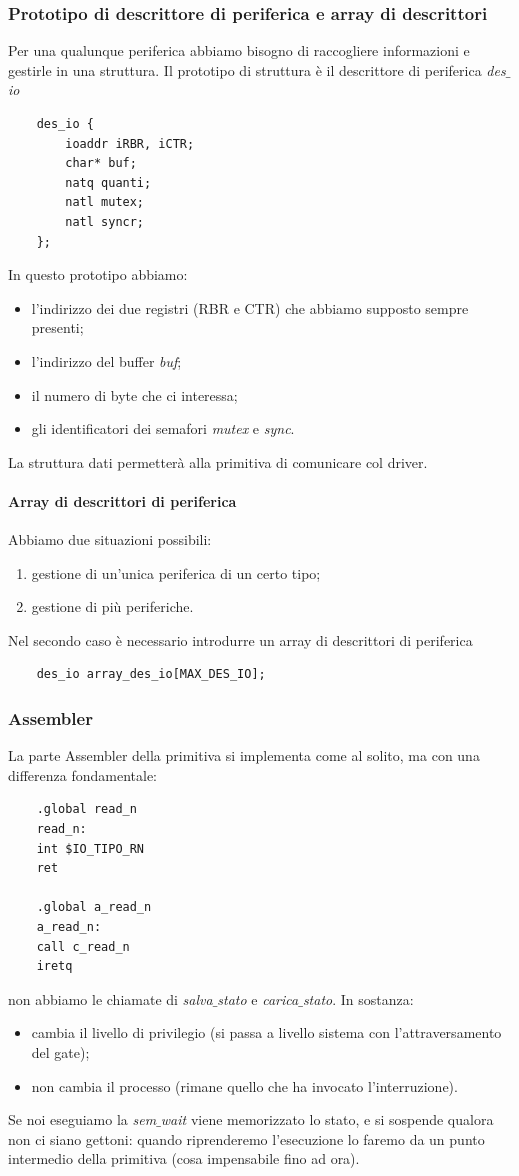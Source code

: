\subsubsection{Prototipo di descrittore di periferica e array di descrittori} Per una qualunque periferica abbiamo bisogno di raccogliere informazioni e gestirle in una struttura. Il prototipo di struttura è il descrittore di periferica \emph{des$\_$io}
\begin{verbatim}
	des_io {
		ioaddr iRBR, iCTR;
		char* buf;
		natq quanti;
		natl mutex;
		natl syncr;
	};
\end{verbatim}
In questo prototipo abbiamo:
\begin{itemize}
	\item l'indirizzo dei due registri (RBR e CTR) che abbiamo supposto sempre presenti;
	\item l'indirizzo del buffer \emph{buf};
	\item il numero di byte che ci interessa;
	\item gli identificatori dei semafori \emph{mutex} e \emph{sync}.
\end{itemize}
La struttura dati permetterà alla primitiva di comunicare col driver.
\paragraph{Array di descrittori di periferica}
Abbiamo due situazioni possibili:
\begin{enumerate}
	\item gestione di un'unica periferica di un certo tipo;
	\item gestione di più periferiche.
\end{enumerate} 
Nel secondo caso è necessario introdurre un array di descrittori di periferica
\begin{verbatim}
	des_io array_des_io[MAX_DES_IO];
\end{verbatim}


\subsubsection{Assembler} La parte Assembler della primitiva si implementa come al solito, ma con una differenza fondamentale:
\begin{verbatim}
	.global read_n
	read_n:
	int $IO_TIPO_RN
	ret
	
	.global a_read_n
	a_read_n:
	call c_read_n
	iretq
\end{verbatim}
non abbiamo le chiamate di \emph{salva$\_$stato} e \emph{carica$\_$stato}. In sostanza:
\begin{itemize}
	\item cambia il livello di privilegio (si passa a livello sistema con l'attraversamento del gate);
	\item non cambia il processo (rimane quello che ha invocato l'interruzione).
\end{itemize} 
Se noi eseguiamo la \emph{sem$\_$wait} viene memorizzato lo stato, e si sospende qualora non ci siano gettoni: quando riprenderemo l'esecuzione lo faremo da un punto intermedio della primitiva (cosa impensabile fino ad ora).

